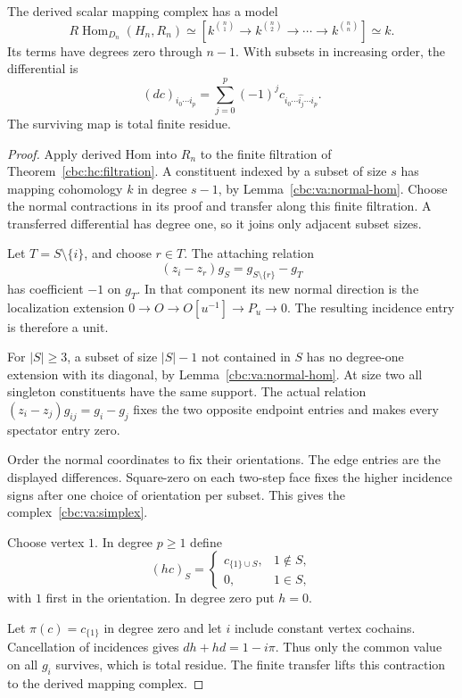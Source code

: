 \begin{theorem}\label{cbc:va:scalar-simplex}
The derived scalar mapping complex has a model
\begin{equation}\label{cbc:va:simplex}
 R\operatorname{Hom}_{D_n}(H_n,R_n)
 \simeq
 \left[k^{\binom n1}\longrightarrow k^{\binom n2}
       \longrightarrow\cdots\longrightarrow k^{\binom nn}\right]
 \simeq k.
\end{equation}
Its terms have degrees zero through $n-1$. With subsets
in increasing order, the differential is
\[
 (dc)_{i_0\cdots i_p}
   =\sum_{j=0}^p(-1)^j
             c_{i_0\cdots\widehat{i_j}\cdots i_p}.
\]
The surviving map is total finite residue.
\end{theorem}
\begin{proof}
Apply derived Hom into $R_n$ to the finite filtration
of Theorem~\ref{cbc:hc:filtration}. A constituent
indexed by a subset of size $s$ has mapping cohomology
$k$ in degree $s-1$, by Lemma~\ref{cbc:va:normal-hom}.
Choose the normal contractions in its proof and transfer
along this finite filtration. A transferred differential
has degree one, so it joins only adjacent subset sizes.

Let $T=S\setminus\{i\}$, and choose $r\in T$.
The attaching relation
\[
 (z_i-z_r)g_S=g_{S\setminus\{r\}}-g_T
\]
has coefficient $-1$ on $g_T$. In that component its
new normal direction is the localization extension
$0\to O\to O[u^{-1}]\to P_u\to0$.
The resulting incidence entry is therefore a unit.

For $|S|\geq3$, a subset of size $|S|-1$ not contained
in $S$ has no degree-one extension with its diagonal,
by Lemma~\ref{cbc:va:normal-hom}.
At size two all singleton constituents have the same
support. The actual relation
$(z_i-z_j)g_{ij}=g_i-g_j$ fixes the two opposite
endpoint entries and makes every spectator entry zero.

Order the normal coordinates to fix their orientations.
The edge entries are the displayed differences.
Square-zero on each two-step face fixes the higher
incidence signs after one choice of orientation per subset.
This gives the complex~\eqref{cbc:va:simplex}.

Choose vertex $1$. In degree $p\geq1$ define
\[
 (hc)_S=
 \begin{cases}
 c_{\{1\}\cup S},&1\notin S,\\
 0,&1\in S,
 \end{cases}
\]
with $1$ first in the orientation. In degree zero put $h=0$.

Let $\pi(c)=c_{\{1\}}$ in degree zero and let $i$ include
constant vertex cochains. Cancellation of incidences gives
$dh+hd=1-i\pi$. Thus only the common value on all $g_i$
survives, which is total residue. The finite transfer
lifts this contraction to the derived mapping complex.
\end{proof}

